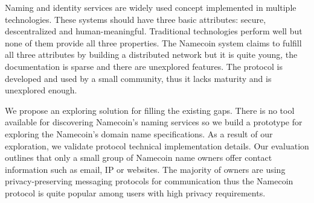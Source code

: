 
Naming and identity services are widely used concept implemented in multiple technologies. These systems should have three basic attributes: secure, descentralized and human-meaningful.
Traditional technologies perform well but none of them provide all three properties. The Namecoin system claims to fulfill all three attributes by building a distributed network but it is quite young, the documentation is sparse and there are unexplored features. The protocol is developed and used by a small community, thus it lacks maturity and is unexplored enough.

We propose an exploring solution for filling the existing gaps.
There is no tool available for discovering Namecoin's naming services so we build a prototype for exploring the Namecoin's domain name specifications. As a result of our exploration, we validate protocol technical implementation details. 
Our evaluation outlines that only a small group of Namecoin name owners offer contact information such as email, IP or websites. The majority of owners are using privacy-preserving messaging protocols for communication thus the Namecoin protocol is quite popular among users with high privacy requirements.